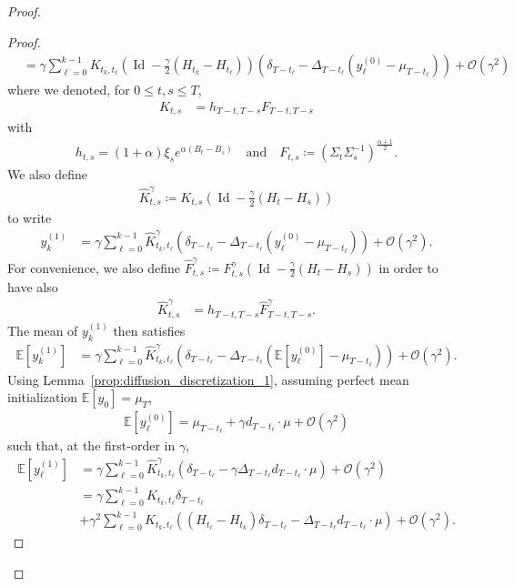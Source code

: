\documentclass[11pt]{article}
\newcommand{\eqdef}{\coloneqq}
\newcommand{\id}{\operatorname{Id}}
\newcommand{\EE}{\mathbb{E}}
\begin{document}
\begin{proof}
\begin{proof}
\begin{align*}
    &= \gamma \sum_{\ell=0}^{k-1} K_{t_k, t_\ell}\left(\id - \frac{\gamma}{2}(H_{t_{k}} - H_{t_\ell})\right) \left( \delta_{T-t_\ell} - \Delta_{T-t_\ell} (y^{(0)}_\ell - \mu_{T-t_\ell}) \right) + \mathcal{O}(\gamma^2)
\end{align*}
where we denoted, for $0 \leq t,s \leq T$,
\begin{align*}
K_{t,s}&= h_{T-t, T-s} F_{T-t, T-s}
\end{align*}
with 
\begin{align*}
h_{t,s} =  (1+\alpha) \xi_{s}e^{ \alpha (B_t-B_s)} \quad \text{and} \quad F_{t,s} \eqdef  ( \Sigma_{t} \Sigma_{s}^{-1})^{\frac{\alpha+1}{2}}.
\end{align*}
We also define
\begin{align*}
\hat K^\gamma_{t,s} \eqdef K_{t,s}\left(\id - \frac{\gamma}{2}(H_{t} - H_{s})\right)
\end{align*}
to write
\begin{align*}
y^{(1)}_k &= \gamma \sum_{\ell=0}^{k-1} \hat K^\gamma_{t_k, t_\ell} \left( \delta_{T-t_\ell} - \Delta_{T-t_\ell} (y^{(0)}_\ell - \mu_{T-t_\ell}) \right) + \mathcal{O}(\gamma^2).
\end{align*}
For convenience, we also define $\hat F^\gamma_{t,s} \eqdef  F^\gamma_{t,s}\left(\id - \frac{\gamma}{2}(H_{t} - H_{s})\right)$ in order to have also
\begin{align*}
\hat K^\gamma_{t,s}&= h_{T-t, T-s} \hat F^\gamma _{T-t, T-s}.
\end{align*}
The mean of $y^{(1)}_k$ then satisfies
\begin{align*}
\EE\left[y^{(1)}_k\right] &=  \gamma \sum_{\ell=0}^{k-1} \hat K^\gamma_{t_k, t_\ell} \left( \delta_{T-t_\ell} - \Delta_{T-t_\ell} (\EE\left[y^{(0)}_\ell\right] - \mu_{T-t_\ell}) \right) + \mathcal{O}(\gamma^2) .
\end{align*}
Using Lemma~\ref{prop:diffusion_discretization_1}, assuming perfect mean initialization $\EE[y_0] = \mu_T$, 
\begin{align*}
\EE\left[y^{(0)}_\ell\right] = \mu_{T-t_\ell} + \gamma d_{T-t_\ell} \cdot \mu  + \mathcal{O}(\gamma^2)
\end{align*}
such that, at the first-order in $\gamma$,
\begin{align*}
\EE \left[y^{(1)}_\ell\right] &=  \gamma \sum_{\ell=0}^{k-1}\hat K^\gamma_{t_k, t_\ell} \left( \delta_{T-t_\ell} - \gamma \Delta_{T-t_\ell} d_{T-t_\ell} \cdot \mu \right) + \mathcal{O}(\gamma^2) \\
&=  \gamma \sum_{\ell=0}^{k-1} K_{t_k, t_\ell} \delta_{T-t_\ell}  \\
&+ \nonumber \gamma^2 \sum_{\ell=0}^{k-1} K_{t_k, t_\ell} \left( (H_{t_\ell}- H_{t_k})\delta_{T-t_\ell} -  \Delta_{T-t_\ell} d_{T-t_\ell} \cdot \mu \right)
+ \mathcal{O}(\gamma^2).
\end{align*}


\end{proof}
\end{proof}
\end{document}
